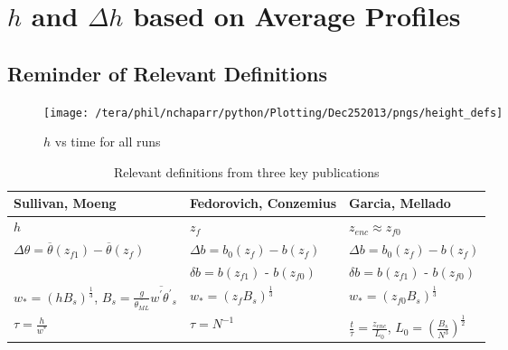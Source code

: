\clearpage

\section{$h$ and  $\Delta h$ based on Average Profiles}
\label{sec:hdeltahavprofs}

\FloatBarrier

\subsection{Reminder of Relevant Definitions}
\FloatBarrier
\begin{figure}[htbp]
    \centering
    \texttt{[image: /tera/phil/nchaparr/python/Plotting/Dec252013/pngs/height\_defs]}
    \caption{$h$ vs time for all runs}
    \label{fig:hvstime}   %
\end{figure}

\begin{table}[!ht]
    \begin{center}
    \begin{tabular}{ | p{3cm} | p{3cm} | p{3cm} |}
    \hline
     Sullivan, Moeng & Fedorovich, Conzemius &  Garcia, Mellado\\ \hline
     $h$ & $z_{f}$& $z_{enc} \approx z_{f0}$ \\ \hline
     $\Delta \theta = \overline{\theta}(z_{f1})-\overline{\theta}(z_{f})$ & $\Delta b = b_{0}(z_{f}) -b(z_{f})$ & $\Delta b = b_{0}(z_{f}) - b(z_{f}) $\\ \hline
      & $\delta b = b(z_{f1})$ - $b(z_{f0})$ & $\delta b = b(z_{f1})$ - $b(z_{f0})$\\ \hline
      $w_{*}= (h B_{s})^{\frac{1}{3}}$, $B_{s} = \frac{g}{\overline{\theta_{ML}}}\overline{w^{'}\theta^{'}}_{s}$ & $w_{*}= (z_{f} B_{s})^{\frac{1}{3}}$ & $w_{*}= (z_{f0} B_{s})^{\frac{1}{3}}$\\ \hline
      $\tau = \frac{h}{w^{*}}$ & $\tau=N^{-1}$ & $\frac{t}{\tau}=\frac{z_{enc}}{L_{0}}$, $L_{0}=\left(\frac{B_{s}}{N^{3}}\right)^{\frac{1}{2}}$\\ \hline
 
   
\end{tabular}
\caption{Relevant definitions from three key publications}
\label{fig:}   
\end{center}    
\end{table}



